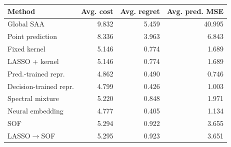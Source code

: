 \begin{tabular}{lrrr}
\toprule
Method & Avg. cost & Avg. regret & Avg. pred. MSE \\
\midrule
Global SAA & 9.832 & 5.459 & 40.995 \\
Point prediction & 8.336 & 3.963 & 6.843 \\
Fixed kernel & 5.146 & 0.774 & 1.689 \\
LASSO + kernel & 5.146 & 0.774 & 1.689 \\
Pred.-trained repr. & 4.862 & 0.490 & 0.746 \\
Decision-trained repr. & 4.799 & 0.426 & 1.003 \\
Spectral mixture & 5.220 & 0.848 & 1.971 \\
Neural embedding & 4.777 & 0.405 & 1.134 \\
SOF & 5.294 & 0.922 & 3.655 \\
LASSO$\to$SOF & 5.295 & 0.923 & 3.651 \\
\bottomrule
\end{tabular}

